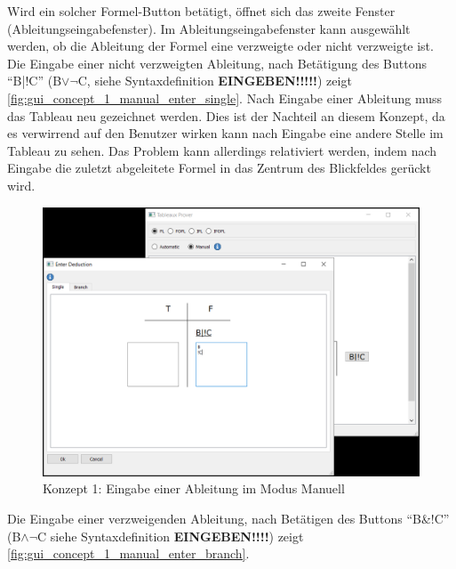 Wird ein solcher Formel-Button betätigt, öffnet sich das zweite Fenster (Ableitungseingabefenster). Im Ableitungseingabefenster kann ausgewählt werden, ob die Ableitung der Formel eine verzweigte oder nicht verzweigte ist. Die Eingabe einer nicht verzweigten Ableitung, nach Betätigung des Buttons \enquote{B|!C} (B$\vee\neg$C, siehe Syntaxdefinition \textbf{EINGEBEN!!!!!}) zeigt \autoref{fig:gui_concept_1_manual_enter_single}. Nach Eingabe einer Ableitung muss das Tableau neu gezeichnet werden. Dies ist der Nachteil an diesem Konzept, da es verwirrend auf den Benutzer wirken kann nach Eingabe eine andere Stelle im Tableau zu sehen. Das Problem kann allerdings relativiert werden, indem nach Eingabe die zuletzt abgeleitete Formel in das Zentrum des Blickfeldes gerückt wird.

\begin{figure}[H]
\begin{center}
\includegraphics[scale=0.7]{images/gui_concept_1_manual_enter_single.png}
\caption{Konzept 1: Eingabe einer Ableitung im Modus Manuell}
\label{fig:gui_concept_1_manual_enter_single}
\end{center}
\end{figure}

Die Eingabe einer verzweigenden Ableitung, nach Betätigen des Buttons \enquote{B\&!C} (B$\wedge\neg$C siehe Syntaxdefinition \textbf{EINGEBEN!!!!}) zeigt \autoref{fig:gui_concept_1_manual_enter_branch}.

